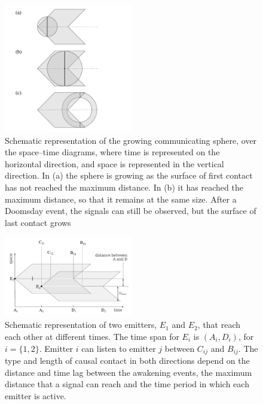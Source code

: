 \documentclass[crop]{CSLB}%
\begin{document}
 

\begin{figure}
   \centering
   \includegraphics[width=0.5\textwidth]{growingsphere.pdf}
   \caption{Schematic representation of the growing communicating
   sphere, over the space--time diagrams, where time is represented on
   the horizontal direction, and space is represented in the vertical
   direction.  In (a) the sphere is
   growing as the surface of first contact has not reached the maximum
   distance.  In (b) it has reached the maximum distance, so that it
   remains at the same size.  After a Doomsday event, the signals can
   still be observed, but the surface of last contact grows }
   \label{F_growing_sphere}
\end{figure}

  
\begin{figure}
   \centering
   \includegraphics[width=0.5\textwidth]{abcd.pdf}
   \caption{Schematic representation of two emitters, $E_1$ and $E_2$,
   that reach each other at different times.  The time span for $E_i$
   is $(A_i, D_i)$, for $i=\{1,2\}$.  Emitter $i$ can listen to
   emitter $j$ between $C_{ij}$ and $B_{ij}$.
   The type and length of causal contact in both directions depend on
   the distance and time lag between the awakening events, the maximum
   distance that a signal can reach and the time period in which each
   emitter is active.}
   \label{F_abcd}
\end{figure}
                               
\end{document}
